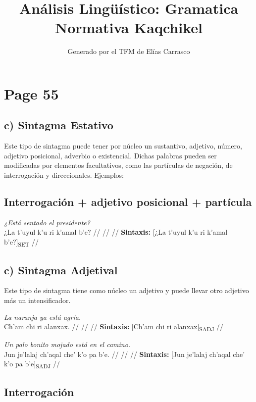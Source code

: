 \documentclass{article}%
\title{Análisis Lingüístico: Gramatica Normativa Kaqchikel}%
\author{Generado por el TFM de Elías Carrasco}%
\begin{document}
%
\normalsize%
\maketitle%
\section{Page 55}%
\label{sec:Page55}%
\subsection{c) Sintagma Estativo}%
\label{subsec:c)SintagmaEstativo}%

%
Este tipo de sintagma puede tener por núcleo un sustantivo, adjetivo, número, adjetivo %
posicional, adverbio o existencial. Dichas palabras pueden ser modificadas por %
elementos facultativos, como las partículas de negación, de interrogación y direccionales. %
Ejemplos: %
\subsection{Interrogación + adjetivo posicional + partícula}%
\label{subsec:Interrogacin+adjetivoposicional+partcula}%

%
\par\medskip%
\ex
\textit{¿Está sentado el presidente?} \\
\begingl
\gla ¿La t’uyul k’u ri k’amal b’e? //
\glb  //
\glc  //
\glft \textbf{Sintaxis:} [¿La t’uyul k’u ri k’amal b’e?]\textsubscript{SET} //
\endgl
\xe
%
\medskip%
\subsection{c) Sintagma Adjetival}%
\label{subsec:c)SintagmaAdjetival}%

%
Este tipo de sintagma tiene como núcleo un adjetivo y puede llevar otro adjetivo más un %
intensificador. %
\par\medskip%
\ex
\textit{La naranja ya está agria.} \\
\begingl
\gla Ch’am chi ri alanxax. //
\glb  //
\glc  //
\glft \textbf{Sintaxis:} [Ch’am chi ri alanxax]\textsubscript{SADJ} //
\endgl
\xe
%
\medskip%
\par\medskip%
\ex
\textit{Un palo bonito mojado está en el camino.} \\
\begingl
\gla Jun je’lalaj ch’aqal che’ k’o pa b’e. //
\glb  //
\glc  //
\glft \textbf{Sintaxis:} [Jun je’lalaj ch’aqal che’ k’o pa b’e]\textsubscript{SADJ} //
\endgl
\xe
%
\medskip%
\subsection{Interrogación}%
\label{subsec:Interrogacin}%
\end{document}
